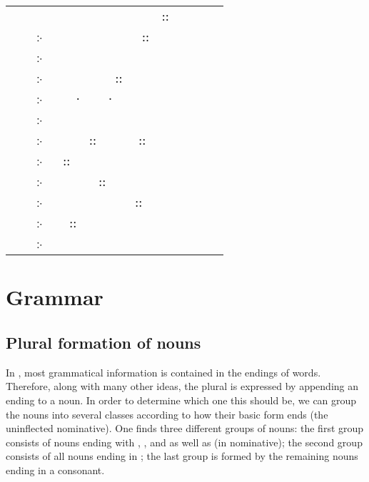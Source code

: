 \section{}
\begin{elvish}
\begin{tabularx}{\textwidth}{r@{ }X}
       &      ⸬   \\
჻ &     ⸬ \\
჻    &   \\
჻ &   ⸬ \\
჻    &  ⸱ ⸱    \\
჻  &   \\
჻ &  ⸬  ⸬    \\
჻  & ⸬ \\
჻ &  ⸬ \\
჻  &    ⸬ \\
჻ & ⸬  \\
჻  & 
\end{tabularx}
\end{elvish}

\section{Grammar}
\subsection{Plural formation of nouns}
In \quenya, most grammatical information is contained in the endings of words.
Therefore, along with many other ideas, the plural is expressed by appending an
ending to a noun. In order to determine which one this should be, we can group
the nouns into several classes according to how their basic form ends (the
uninflected nominative). One finds three different groups of nouns:
the first group consists of nouns ending with , ,  and
 as well as  (in nominative); the second group consists of all
nouns ending in ; the last group is formed by the remaining nouns ending
in a consonant.

